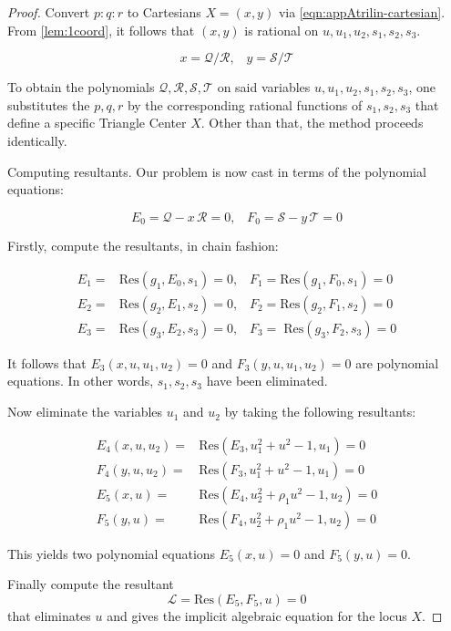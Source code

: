 \begin{proof}
Convert $p:q:r$ to Cartesians $ X = (x,y)$ via  \cref{eqn:appAtrilin-cartesian}. From  \cref{lem:1coord}, it follows that
$\left(x,y\right)$ is rational on $u,u_1,u_2,s_1,s_2,s_3$.

\begin{equation*} x=\mathcal{Q}/\mathcal{R},\;\;\;y=\mathcal{S}/\mathcal{T}
\end{equation*}

\noindent To obtain the polynomials    $\mathcal{Q,R,S,T}$  on said variables $u,u_1,u_2,s_1,s_2,s_3$,
 one substitutes the 
$p,q,r$ by the corresponding rational functions of  $s_1, s_2, s_3$ that define a specific Triangle Center $X$. Other than that, the method proceeds identically.

\begin{step}
Computing resultants.
Our problem is now cast in terms of the polynomial equations:

\begin{equation*}
E_0= \mathcal{Q}-x\,\mathcal{R}=0,\;\;\; F_0= \mathcal{S}-y\,\mathcal{T}=0
\end{equation*}

\end{step}

Firstly, compute the resultants, in chain fashion:  

\begin{align*}
    E_1=&\textrm{Res}(g_1,E_0,s_1)=0,\;\;\;F_1=\textrm{Res}(g_1,F_0,s_1)=0\\
	E_2=&\textrm{Res}(g_2,E_1,s_2)=0,\;\;\;F_2=\textrm{Res}(g_2,F_1,s_2)=0\\
	E_3=&\textrm{Res}(g_3,E_2,s_3)=0,\;\;\;F_3=\;\textrm{Res}(g_3,F_2,s_3)=0
\end{align*}
		 
It follows that  $E_3(x,u,u_1,u_2)=0$ and $F_3(y,u,u_1,u_2)=0$ are polynomial
equations. In other words, $s_1, s_2, s_3$ have been eliminated. 

Now  eliminate the variables $u_1$ and $u_2$ by taking the following resultants:

\begin{align*}
	E_4(x,u,u_2)=&\textrm{Res}(E_3,u_1^2+u^2-1,u_1)=0\\ 	F_4(y,u,u_2)=&\textrm{Res}(F_3,u_1^2+u^2-1,u_1)=0\\
	E_5(x,u)=&\textrm{Res}(E_4,u_2^2+\rho_1 u^2-1,u_2)=0\\
	F_5(y,u)=&\textrm{Res}(F_4,u_2^2+\rho_1 u^2-1,u_2)=0
\end{align*}

This yields two polynomial equations $E_5(x,u)=0$ and $F_5(y,u)=0$. 

Finally compute the resultant
$$ {\mathcal L} = \textrm{Res}(E_5,F_5,u)=0
$$
that eliminates $u$ and gives  the implicit algebraic equation for the locus $X$. 
\end{proof}

